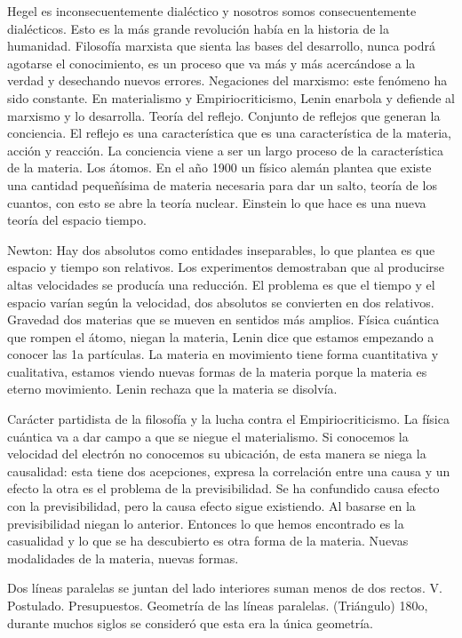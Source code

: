 \documentclass[
  a4paper,
]{article}
\begin{document}
Hegel es inconsecuentemente dialéctico y nosotros somos consecuentemente
dialécticos. Esto es la más grande revolución había en la historia de la
humanidad. Filosofía marxista que sienta las bases del desarrollo, nunca
podrá agotarse el conocimiento, es un proceso que va más y más
acercándose a la verdad y desechando nuevos errores. Negaciones del
marxismo: este fenómeno ha sido constante. En materialismo y
Empiriocriticismo, Lenin enarbola y defiende al marxismo y lo
desarrolla. Teoría del reflejo. Conjunto de reflejos que generan la
conciencia. El reflejo es una característica que es una característica
de la materia, acción y reacción. La conciencia viene a ser un largo
proceso de la característica de la materia. Los átomos. En el año 1900
un físico alemán plantea que existe una cantidad pequeñísima de materia
necesaria para dar un salto, teoría de los cuantos, con esto se abre la
teoría nuclear. Einstein lo que hace es una nueva teoría del espacio
tiempo.

Newton: Hay dos absolutos como entidades inseparables, lo que plantea es
que espacio y tiempo son relativos. Los experimentos demostraban que al
producirse altas velocidades se producía una reducción. El problema es
que el tiempo y el espacio varían según la velocidad, dos absolutos se
convierten en dos relativos. Gravedad dos materias que se mueven en
sentidos más amplios. Física cuántica que rompen el átomo, niegan la
materia, Lenin dice que estamos empezando a conocer las 1a partículas.
La materia en movimiento tiene forma cuantitativa y cualitativa, estamos
viendo nuevas formas de la materia porque la materia es eterno
movimiento. Lenin rechaza que la materia se disolvía.

Carácter partidista de la filosofía y la lucha contra el
Empiriocriticismo. La física cuántica va a dar campo a que se niegue el
materialismo. Si conocemos la velocidad del electrón no conocemos su
ubicación, de esta manera se niega la causalidad: esta tiene dos
acepciones, expresa la correlación entre una causa y un efecto la otra
es el problema de la previsibilidad. Se ha confundido causa efecto con
la previsibilidad, pero la causa efecto sigue existiendo. Al basarse en
la previsibilidad niegan lo anterior. Entonces lo que hemos encontrado
es la casualidad y lo que se ha descubierto es otra forma de la materia.
Nuevas modalidades de la materia, nuevas formas.

Dos líneas paralelas se juntan del lado interiores suman menos de dos
rectos. V. Postulado. Presupuestos. Geometría de las líneas paralelas.
(Triángulo) 180o, durante muchos siglos se consideró que esta era la
única geometría.
\end{document}
